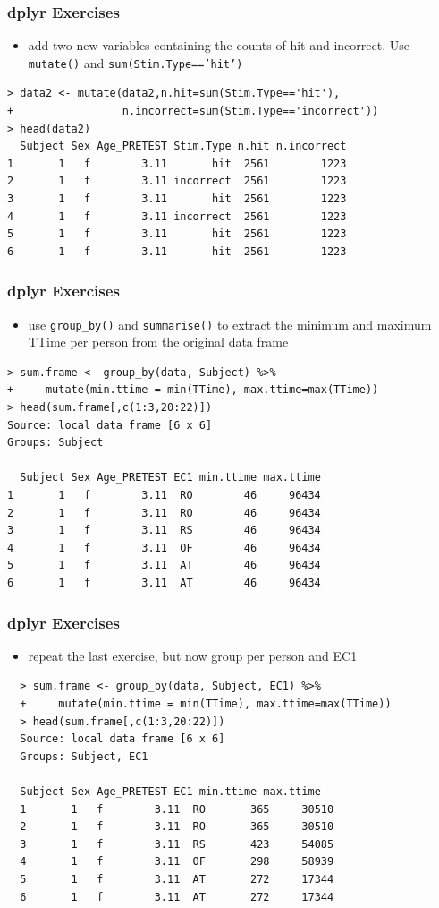 \documentclass[xcolor={table},c]{beamer}
\begin{document}
\begin{frame}[fragile]\frametitle{dplyr Exercises}
  \begin{itemize}
  \item add two new variables containing the counts of hit and incorrect. Use \texttt{mutate()} and \texttt{sum(Stim.Type=='hit')}
  \end{itemize}
\begin{verbatim}
> data2 <- mutate(data2,n.hit=sum(Stim.Type=='hit'),
+                 n.incorrect=sum(Stim.Type=='incorrect'))
> head(data2)
  Subject Sex Age_PRETEST Stim.Type n.hit n.incorrect
1       1   f        3.11       hit  2561        1223
2       1   f        3.11 incorrect  2561        1223
3       1   f        3.11       hit  2561        1223
4       1   f        3.11 incorrect  2561        1223
5       1   f        3.11       hit  2561        1223
6       1   f        3.11       hit  2561        1223
\end{verbatim}
\end{frame}


\begin{frame}[fragile]\frametitle{dplyr Exercises}
  \begin{itemize}
  \item use \texttt{group\_by()} and \texttt{summarise()} to extract the minimum and maximum TTime per person from the original data frame
  \end{itemize}
\begin{verbatim}
> sum.frame <- group_by(data, Subject) %>% 
+     mutate(min.ttime = min(TTime), max.ttime=max(TTime))
> head(sum.frame[,c(1:3,20:22)])
Source: local data frame [6 x 6]
Groups: Subject

  Subject Sex Age_PRETEST EC1 min.ttime max.ttime
1       1   f        3.11  RO        46     96434
2       1   f        3.11  RO        46     96434
3       1   f        3.11  RS        46     96434
4       1   f        3.11  OF        46     96434
5       1   f        3.11  AT        46     96434
6       1   f        3.11  AT        46     96434
\end{verbatim}
\end{frame}


\begin{frame}[fragile]\frametitle{dplyr Exercises}
  \begin{itemize}
  \item repeat the last exercise, but now group per person and EC1
  \end{itemize}
\begin{verbatim}
  > sum.frame <- group_by(data, Subject, EC1) %>% 
  +     mutate(min.ttime = min(TTime), max.ttime=max(TTime))
  > head(sum.frame[,c(1:3,20:22)])
  Source: local data frame [6 x 6]
  Groups: Subject, EC1

  Subject Sex Age_PRETEST EC1 min.ttime max.ttime
  1       1   f        3.11  RO       365     30510
  2       1   f        3.11  RO       365     30510
  3       1   f        3.11  RS       423     54085
  4       1   f        3.11  OF       298     58939
  5       1   f        3.11  AT       272     17344
  6       1   f        3.11  AT       272     17344
\end{verbatim}
\end{frame}
\end{document}
